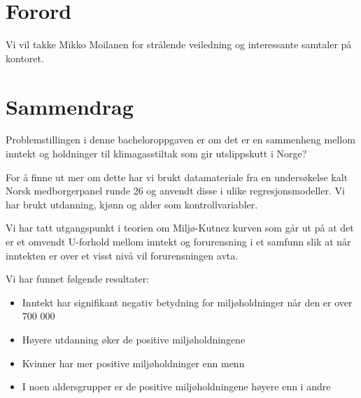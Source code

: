 \documentclass[
  12pt,
  letterpaper,
  DIV=11,
  numbers=noendperiod]{scrartcl}
\renewcommand*\contentsname{Table of contents}
\newcommand\contentsname{Table of contents}
\begin{document}

\ifdefined\Shaded\renewenvironment{Shaded}{\begin{tcolorbox}[enhanced, boxrule=0pt, frame hidden, interior hidden, borderline west={3pt}{0pt}{shadecolor}, breakable, sharp corners]}{\end{tcolorbox}}\fi

\renewcommand*\contentsname{Innhold}
{
\hypersetup{linkcolor=}
\setcounter{tocdepth}{3}
\tableofcontents
}
\newpage

\hypertarget{forord}{%
\section{Forord}\label{forord}}

Vi vil takke Mikko Moilanen for strålende veiledning og interessante
samtaler på kontoret.

\newpage

\hypertarget{sammendrag}{%
\section{Sammendrag}\label{sammendrag}}

Problemstillingen i denne bacheloroppgaven er om det er en sammenheng
mellom inntekt og holdninger til klimagasstiltak som gir utslippskutt i
Norge?

For å finne ut mer om dette har vi brukt datamateriale fra en
undersøkelse kalt Norsk medborgerpanel runde 26 og anvendt disse i ulike
regresjonsmodeller. Vi har brukt utdanning, kjønn og alder som
kontrollvariabler.

Vi har tatt utgangspunkt i teorien om Miljø-Kutnez kurven som går ut på
at det er et omvendt U-forhold mellom inntekt og forurensning i et
samfunn slik at når inntekten er over et visst nivå vil forurensningen
avta.

Vi har funnet følgende resultater:

\begin{itemize}
\item
  Inntekt har signifikant negativ betydning for miljøholdninger når den
  er over 700 000
\item
  Høyere utdanning øker de positive miljøholdningene
\item
  Kvinner har mer positive miljøholdninger enn menn
\item
  I noen aldersgrupper er de positive miljøholdningene høyere enn i
  andre
\end{itemize}
\end{document}
